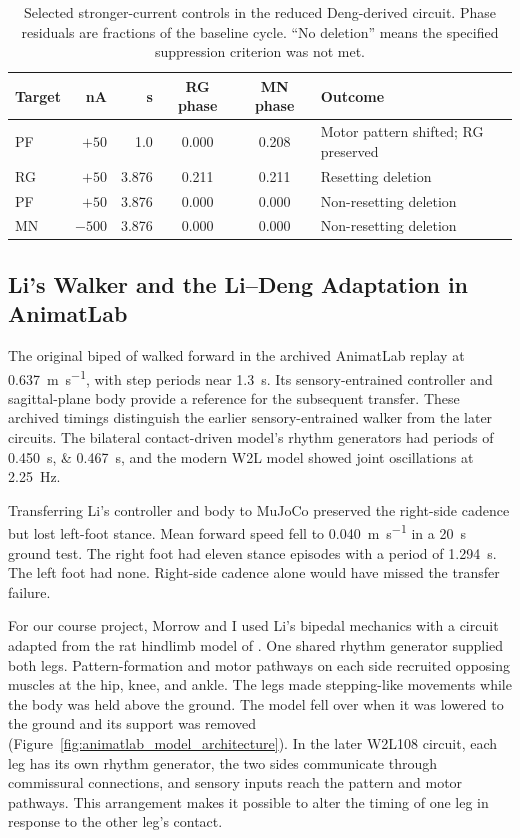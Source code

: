 \begin{table}[htbp]
\centering\small
\caption[Layer-specific stimulation controls]{Selected stronger-current controls in the reduced Deng-derived circuit. Phase residuals are fractions of the baseline cycle. ``No deletion'' means the specified suppression criterion was not met.}
\label{tab:layer_stimulus}
\begin{tabularx}{\textwidth}{@{}lrrcc>{\raggedright\arraybackslash}X@{}}
\toprule
Target & \unit{\nano\ampere} & \unit{\second} & RG phase & MN phase & Outcome \\
\midrule
PF & $+50$ & 1.0 & 0.000 & 0.208 & Motor pattern shifted; RG preserved \\
RG & $+50$ & 3.876 & 0.211 & 0.211 & Resetting deletion \\
PF & $+50$ & 3.876 & 0.000 & 0.000 & Non-resetting deletion \\
MN & $-500$ & 3.876 & 0.000 & 0.000 & Non-resetting deletion \\
\bottomrule
\end{tabularx}
\end{table}

\subsection{Li's Walker and the Li--Deng Adaptation in AnimatLab}\label{sec:animatlab_validation}

The original biped of \citet{li_bipedal_2017} walked forward in the archived AnimatLab replay at \qty{0.637}{\meter\per\second}, with step periods near \qty{1.3}{\second}. Its sensory-entrained controller and sagittal-plane body provide a reference for the subsequent transfer. These archived timings distinguish the earlier sensory-entrained walker from the later circuits. The bilateral contact-driven model's rhythm generators had periods of \qtylist{0.450;0.467}{\second}, and the modern W2L model showed joint oscillations at \qty{2.25}{\hertz}.

Transferring Li's controller and body to MuJoCo preserved the right-side cadence but lost left-foot stance. Mean forward speed fell to \qty{0.040}{\meter\per\second} in a \qty{20}{\second} ground test. The right foot had eleven stance episodes with a period of \qty{1.294}{\second}. The left foot had none. Right-side cadence alone would have missed the transfer failure.

For our course project, Morrow and I used Li's bipedal mechanics with a circuit adapted from the rat hindlimb model of \citet{deng_neuromechanical_2019}. One shared rhythm generator supplied both legs. Pattern-formation and motor pathways on each side recruited opposing muscles at the hip, knee, and ankle. The legs made stepping-like movements while the body was held above the ground. The model fell over when it was lowered to the ground and its support was removed (Figure~\ref{fig:animatlab_model_architecture}). In the later W2L108 circuit, each leg has its own rhythm generator, the two sides communicate through commissural connections, and sensory inputs reach the pattern and motor pathways. This arrangement makes it possible to alter the timing of one leg in response to the other leg's contact.

